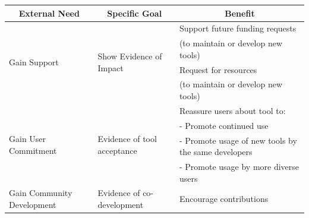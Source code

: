 \documentclass{article}
\begin{document}
\begin{table}
\begin{tabular} {|p{}|p{}|p{}|}
    \hline
    \multicolumn{1}{|c|}{\cellcolor[gray]{.9} \textbf{External Need}} 
    & \multicolumn{1}{|c|}{\cellcolor[gray]{.9} \textbf{Specific Goal}}
    & \multicolumn{1}{|c|}{\cellcolor[gray]{.9} \textbf{Benefit}}\\[1.1ex] %
    \hline
    \multirow{4}{*}{Gain Support}              
    & \multirow{4}{*}{Show Evidence of Impact} & 
    Support future funding requests \\
    & &
    (to maintain or develop new tools) \\
    & &
    Request for resources  \\
    & & 
    (to maintain or develop new tools) \\[1.1ex]
    \hline
    \multirow{4}{*}{Gain User Commitment} 
    & \multirow{4}{*}{Evidence of tool acceptance} & 
    Reassure users about tool to:\\
    &&
    - Promote continued use\\
    && 
    - Promote usage of new tools by the same developers \\ 
    &&
    - Promote usage by more diverse users \\[1.1ex]
    \hline
    \multirow{1}{*}{Gain Community Development} 
    & \multirow{1}{*}{Evidence of co-development} & 
    Encourage contributions  \\
    \hline
  \end{tabular}
  \label{tab:benefit_table}
\end{table}
\end{document}
